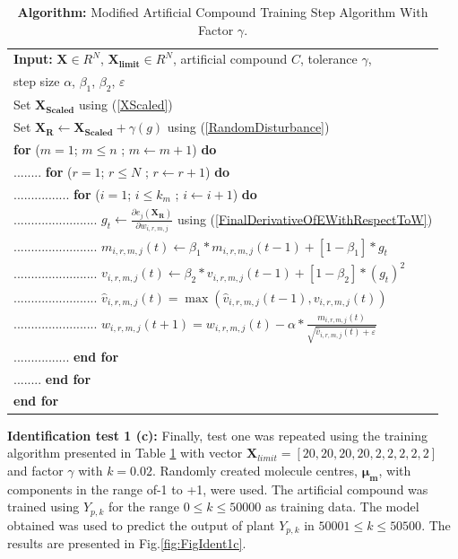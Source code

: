 \documentclass{ieeeaccess}
\begin{document}
\begin{table}[h]
 \centering
 \caption{\textbf{Algorithm:} Modified Artificial Compound Training Step Algorithm With Factor \(\gamma\).}\label{table:Training3}
 \begin{tabular}{l}
 \hline
 \textbf{Input:} \(\mathbf{X}\in R^N\), \(\mathbf{X_{limit}}\in R^N\), artificial compound \(C\), tolerance \(\gamma\),\\
 step size \(\alpha\), \(\beta_1\), \(\beta_2\), \(\varepsilon\)\\
 \hline
 Set \(\mathbf{X_{Scaled}}\) using (\ref{XScaled})\\
 Set \(\mathbf{X_R}\gets\mathbf{X_{Scaled}}+\gamma(g)\) using (\ref{RandomDisturbance}) \\
 \textbf{for} (\(m=1\); \( m\le n\) ; \(m\gets m+1\)) \textbf{do} \\
 ........ \textbf{for} (\(r=1\); \(r\le N\) ; \(r\gets r+1\)) \textbf{do} \\
 ................ \textbf{for} (\(i=1\); \(i\le k_m\) ; \(i\gets i+1\)) \textbf{do} \\
 ........................ \(g_t\gets\frac{\partial e_j(\mathbf{X_R})}{\partial w_{i,r,m,j}}\) using (\ref{FinalDerivativeOfEWithRespectToW}) \\
 ........................ \(m_{i,r,m,j}(t)\gets\beta_1\ast m_{i,r,m,j}(t-1)+[1-\beta_1]\ast g_t\) \\
 ........................ \(v_{i,r,m,j}(t)\gets\beta_2\ast v_{i,r,m,j}(t-1)+[1-\beta_2]\ast(g_t)^2\) \\
 ........................ \({\hat{v}}_{i,r,m,j}(t)=\max{\left({\hat{v}}_{i,r,m,j}(t-1),v_{i,r,m,j}(t)\right)}\) \\
 ........................ \(w_{i,r,m,j}\left(t+1\right)=w_{i,r,m,j}\left(t\right)-\alpha\ast\frac{m_{i,r,m,j}\left(t\right)}{\sqrt{{\hat{v}}_{i,r,m,j}\left(t\right)+\varepsilon}}\) \\
 ................ \textbf{end for} \\
 ........ \textbf{end for} \\
 \textbf{end for} \\
 \hline
 \end{tabular}
\end{table}

\textbf{Identification test 1 (c):} Finally, test one was repeated using the training algorithm presented in Table \ref{table:Training3} with vector \(\mathbf{X}_{limit}=[20,20 ,20,20,2,2,2,2,2]\) and factor \(\gamma\) with \(k=0.02\). Randomly created molecule centres, \(\mathbf{\mu_m}\), with components in the range of-1 to +1, were used. The artificial compound was trained using \(Y_{p,k}\) for the range \(0\leq k \leq 50000\) as training data. The model obtained was used to predict the output of plant \(Y_{p,k}\) in \(50001\le k\le50500\). The results are presented in Fig.\ref{fig:FigIdent1c}.
\end{document}
